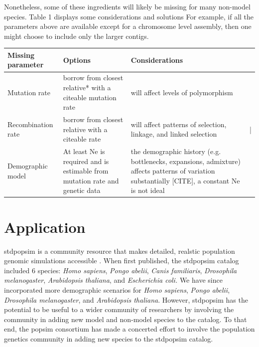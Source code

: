 \documentclass[hidelinks]{article}
\begin{document}
Nonetheless, some of these ingredients will likely be missing for many
non-model species. Table 1 displays some considerations and solutions
For example, if all the parameters above are available except for a
chromosome level assembly, then one might choose to include only the
larger contigs.


\begin{table}[]
     \label{tab:title} 
    \begin{tabular}{@{}llll@{}}
    \toprule
    Missing parameter                        & Options                                                                          & Considerations                                                                                                                                       &   \\ \midrule
    \multicolumn{1}{|l|}{Mutation rate}      & \multicolumn{1}{l|}{borrow from closest relative* with a citeable mutation rate} & \multicolumn{1}{l|}{will affect levels of polymorphism}                                                                                              &   \\ \cmidrule(r){1-3}
    \multicolumn{1}{|l|}{Recombination rate} & \multicolumn{1}{l|}{borrow from closest relative with a citeable rate}           & \multicolumn{1}{l|}{will affect patterns of selection, linkage, and linked selection}                                                                & | \\ \cmidrule(r){1-3}
    Demographic model                        & At least Ne is required and is estimable from mutation rate and genetic data     & the demographic history (e.g. bottlenecks, expansions, admixture) affects patterns of variation substantially {[}CITE{]}, a constant Ne is not ideal &   \\ \bottomrule
    \end{tabular}
\end{table}

\hypertarget{application}{%
\section*{Application}\label{application}}

stdpopsim is a community resource that makes detailed, realstic
population genomic simulations accessible \citep{Adrion2020}. When first
published, the stdpopsim catalog included 6 species: \emph{Homo
sapiens}, \emph{Pongo abelii}, \emph{Canis familiaris}, \emph{Drosophila
melanogaster}, \emph{Arabidopsis thaliana}, and \emph{Escherichia coli.}
We have since incorporated more demographic scenarios for \emph{Homo sapiens},
\emph{Pongo abelii}, \emph{Drosophila melanogaster}, and
\emph{Arabidopsis thaliana}. However, stdpopsim has the potential to be
useful to a wider community of researchers by involving the community
in adding new model and non-model species to the catalog.
To that end, the popsim consortium has made a concerted effort to 
involve the population genetics community in adding new species 
to the stdpopsim catalog.
\end{document}
